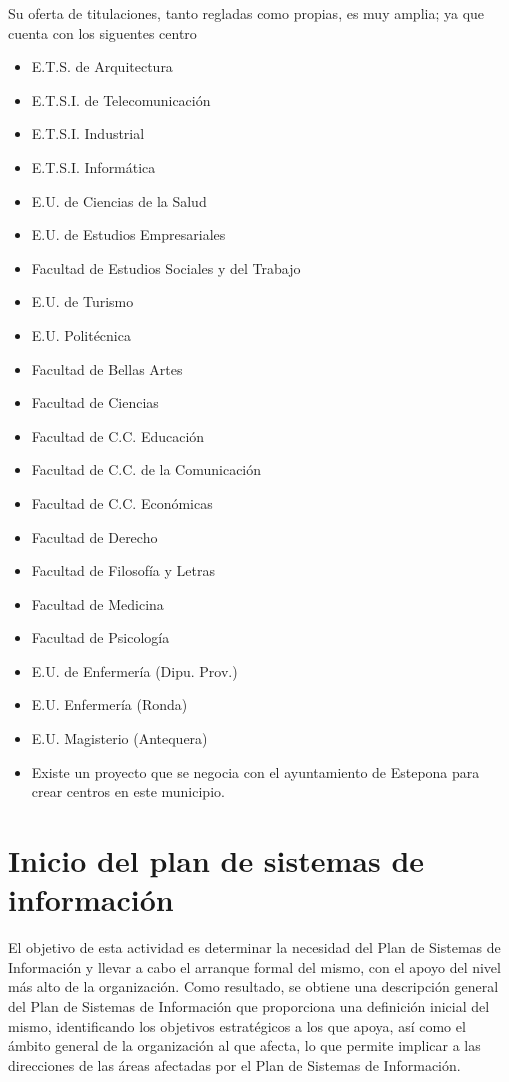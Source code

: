 \documentclass[11pt,a4paper,spanish,twoside]{book}
\begin{document}
Su oferta de titulaciones, tanto regladas como propias, es muy amplia; ya que 
cuenta con los siguentes centro
\begin{itemize}
  \item E.T.S. de Arquitectura
  \item E.T.S.I. de Telecomunicación
  \item E.T.S.I. Industrial
  \item E.T.S.I. Informática
  \item E.U. de Ciencias de la Salud
  \item E.U. de Estudios Empresariales
  \item Facultad de Estudios Sociales y del Trabajo
  \item E.U. de Turismo
  \item E.U. Politécnica
  \item Facultad de Bellas Artes
  \item Facultad de Ciencias
  \item Facultad de C.C. Educación
  \item Facultad de C.C. de la Comunicación
  \item Facultad de C.C. Económicas
  \item Facultad de Derecho
  \item Facultad de Filosofía y Letras
  \item Facultad de Medicina
  \item Facultad de Psicología
  \item E.U. de Enfermería (Dipu. Prov.)
  \item E.U. Enfermería (Ronda)
  \item E.U. Magisterio (Antequera)
  \item Existe un proyecto que se negocia con el ayuntamiento de Estepona para 
      crear centros en este municipio.
\end{itemize}

\chapter{Inicio del plan de sistemas de información}
El objetivo de esta actividad es determinar la necesidad del Plan de Sistemas  
de Información y llevar a cabo el arranque formal del mismo, con el apoyo del
nivel más alto de la organización. Como resultado, se obtiene una descripción
general del Plan de Sistemas de Información que proporciona una definición
inicial del mismo, identificando los objetivos estratégicos a los que apoya,
así como el ámbito general de la organización al que afecta, lo que permite
implicar a las direcciones de las áreas afectadas por el Plan de Sistemas de
Información. 
\end{document}
